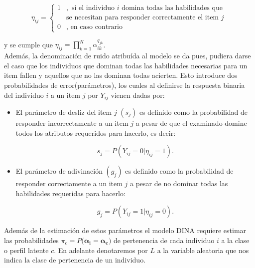 			\begin{equation}
				\eta_{i j}=\left\{\begin{array}{cl}
							1	& ,\mbox{ si el individuo } i \text { domina todas las habilidades que } \\
								& \mbox{se necesitan para responder correctamente el item } j \\
							 {0} & ,\mbox{ en caso contrario}
						\end{array}\right. \label{2.26}
			\end{equation}
			
			y se cumple que $\eta_{i j}=\prod_{k=1}^{K} \alpha_{i k}^{q_{j k}}$.\\
			
			Adem\'{a}s, la denominaci\'{o}n de ruido atribu\'{i}da al modelo se da pues, pudiera darse el caso que los individuos que dominan todas las habilidades necesarias para un item fallen y aquellos que no las dominan todas acierten.
			Esto introduce dos probabilidades de error(par\'{a}metros), los cuales al definirse la respuesta binaria del individuo $i$ a un item $j$ por $Y_{ij}$ vienen dadas por:
			
			\begin{itemize}
				\item El par\'{a}metro de desliz del item $j$ $({ s }_{ j })$ es definido como la probabilidad de responder incorrectamente a un item $j$ a pesar de que el examinado domine todos los atributos requeridos para hacerlo, es decir:
				
				\begin{equation}
					{s}_{j}=P({Y}_{ij}=0|{ \eta  }_{ ij }=1). \label{2.27}
				\end{equation}
				
				\item El par\'{a}metro de adivinaci\'{o}n $({g}_{j})$ es definido como la probabilidad de responder correctamente a un item $j$ a pesar de no dominar todas las habilidades requeridas para hacerlo:
				
				\begin{equation}
					g_{ j }=P({ Y }_{ ij }=1|{ \eta  }_{ ij }=0). \label{2.28}
				\end{equation}
			\end{itemize}	
				
			Adem\'{a}s de la estimaci\'{o}n de estos par\'{a}metros el modelo DINA requiere estimar las probabilidades ${ \pi  }_{ c }=P({ \boldsymbol{\alpha_{i} }}={\boldsymbol{\alpha_{c}})}$ de pertenencia de cada individuo $i$ a la clase o perfil latente $c$. En adelante denotaremos por $L$ a la variable aleatoria que nos indica la clase de pertenencia de un individuo.
			
